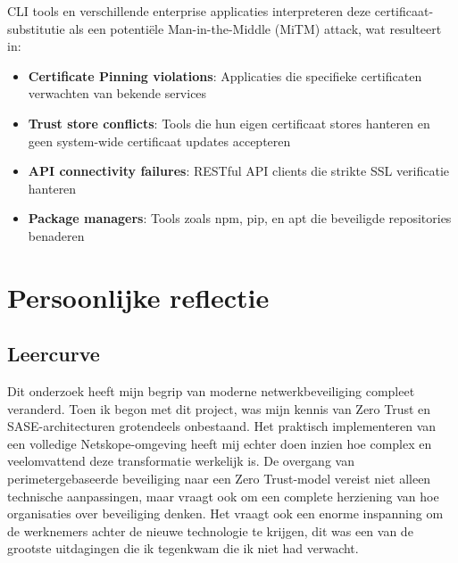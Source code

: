 CLI tools en verschillende enterprise applicaties interpreteren deze certificaat-substitutie als een potentiële Man-in-the-Middle (MiTM) attack, wat resulteert in:

\begin{itemize}
    \item \textbf{Certificate Pinning violations}: Applicaties die specifieke certificaten verwachten van bekende services
    \item \textbf{Trust store conflicts}: Tools die hun eigen certificaat stores hanteren en geen system-wide certificaat updates accepteren
    \item \textbf{API connectivity failures}: RESTful API clients die strikte SSL verificatie hanteren
    \item \textbf{Package managers}: Tools zoals npm, pip, en apt die beveiligde repositories benaderen
\end{itemize}

\section{Persoonlijke reflectie}
\subsection{Leercurve}
Dit onderzoek heeft mijn begrip van moderne netwerkbeveiliging compleet veranderd. Toen ik begon met dit project, was mijn kennis van Zero Trust en SASE-architecturen grotendeels onbestaand. Het praktisch implementeren van een volledige Netskope-omgeving heeft mij echter doen inzien hoe complex en veelomvattend deze transformatie werkelijk is. De overgang van perimetergebaseerde beveiliging naar een Zero Trust-model vereist niet alleen technische aanpassingen, maar vraagt ook om een complete herziening van hoe organisaties over beveiliging denken. Het vraagt ook een enorme inspanning om de werknemers achter de nieuwe technologie te krijgen, dit was een van de grootste uitdagingen die ik tegenkwam die ik niet had verwacht.

